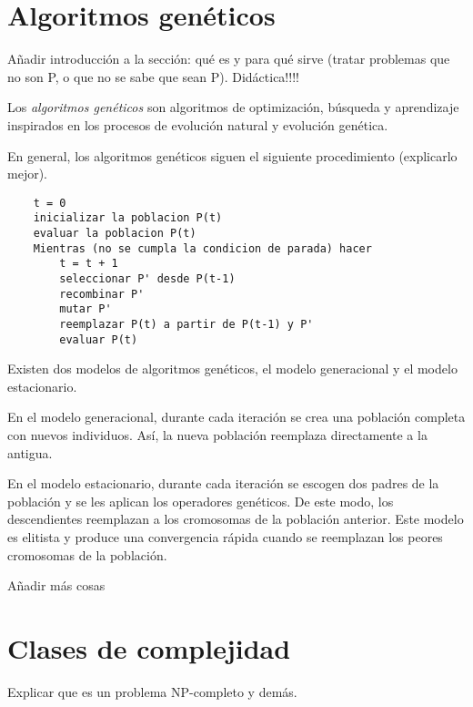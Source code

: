 \section{Algoritmos genéticos}

Añadir introducción a la sección: qué es y para qué sirve (tratar problemas que no son P, o que no se sabe que sean P). Didáctica!!!!

Los \emph{algoritmos genéticos} son algoritmos de optimización, búsqueda y aprendizaje inspirados en los procesos de evolución 
natural y evolución genética.

En general, los algoritmos genéticos siguen el siguiente procedimiento (explicarlo mejor).

\begin{lstlisting}
    t = 0
    inicializar la poblacion P(t)
    evaluar la poblacion P(t)
    Mientras (no se cumpla la condicion de parada) hacer 
        t = t + 1
        seleccionar P' desde P(t-1)
        recombinar P'
        mutar P'
        reemplazar P(t) a partir de P(t-1) y P'
        evaluar P(t)
\end{lstlisting}

Existen dos modelos de algoritmos genéticos, el modelo generacional y el modelo estacionario.

En el modelo generacional, durante cada iteración se crea una población completa con nuevos individuos.
Así, la nueva población reemplaza directamente a la antigua.

En el modelo estacionario, durante cada iteración se escogen dos padres de la población y se les aplican los operadores genéticos.
De este modo, los descendientes reemplazan a los cromosomas de la población anterior.
Este modelo es elitista y produce una convergencia rápida cuando se reemplazan los peores cromosomas de la población.

Añadir más cosas


\section{Clases de complejidad}

Explicar que es un problema NP-completo y demás.